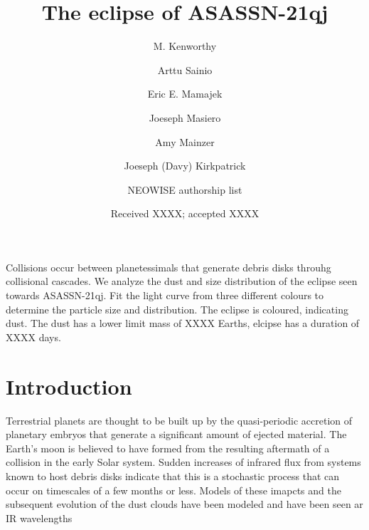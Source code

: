 \documentclass{aa}
\begin{document}
 

   \title{The eclipse of ASASSN-21qj}

   \author{M. Kenworthy
          \and
          Arttu Sainio
          \and
          Eric E. Mamajek
          \and
          Joeseph Masiero
          \and 
          Amy Mainzer
          \and
          Joeseph (Davy) Kirkpatrick
          \and 
          NEOWISE authorship list
          }


   \date{Received XXXX; accepted XXXX}

 
  \abstract
   {Collisions occur between planetessimals that generate debris disks throuhg collisional cascades.}
   {We analyze the dust and size distribution of the eclipse seen towards ASASSN-21qj.}
   {Fit the light curve from three different colours to determine the particle size and distribution.}
   {The eclipse is coloured, indicating dust.
   The dust has a lower limit mass of XXXX Earths, elcipse has a duration of XXXX days.}
   {}


   \maketitle
%

   \section{Introduction}

Terrestrial planets are thought to be built up by the quasi-periodic accretion of planetary embryos that generate a significant amount of ejected material.
%
The Earth's moon is believed to have formed from the resulting aftermath of a collision in the early Solar system.
%
Sudden increases of infrared flux from systems known to host debris disks indicate that this is a stochastic process that can occur on timescales of a few months or less.
%
Models of these imapcts and the subsequent evolution of the dust clouds have been modeled \citep{Jackson12,Jackson14} and have been seen ar IR wavelengths \citep{Su19,Su22}
\end{document}
